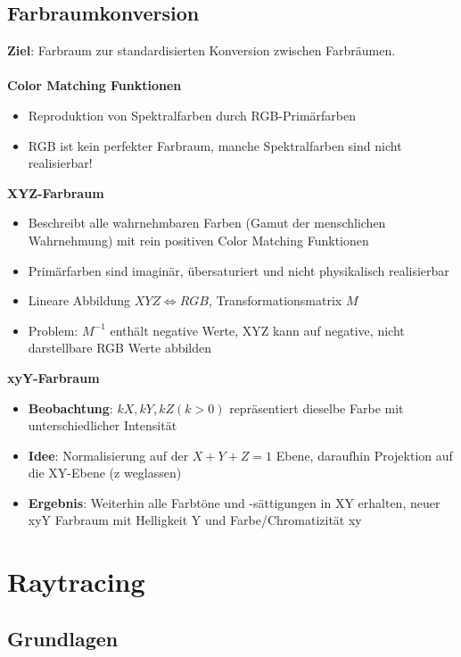 \documentclass[10pt,a4paper]{article}
\begin{document}
	\subsection{Farbraumkonversion}
	\label{bfp:sub:farbraumkonversion}

	\textbf{Ziel}: Farbraum zur standardisierten Konversion zwischen Farbräumen.\\\\
	\textbf{Color Matching Funktionen}
		\begin{itemize}
			\item Reproduktion von Spektralfarben durch RGB-Primärfarben
			\item RGB ist kein perfekter Farbraum, manche Spektralfarben sind nicht realisierbar!
		\end{itemize}		
	\textbf{XYZ-Farbraum}
		\begin{itemize}
			\item Beschreibt alle wahrnehmbaren Farben (\glqq Gamut der menschlichen Wahrnehmung\grqq) mit rein positiven Color Matching Funktionen
			\item Primärfarben sind imaginär, übersaturiert und nicht physikalisch realisierbar
			\item Lineare Abbildung $XYZ \Leftrightarrow RGB$, Transformationsmatrix $M$
			\item Problem: $M^{-1}$ enthält negative Werte, XYZ kann auf negative, nicht darstellbare RGB Werte abbilden
		\end{itemize}
	\textbf{xyY-Farbraum}
		\begin{itemize}
			\item \textbf{Beobachtung}: $kX, kY, kZ (k > 0)$ repräsentiert dieselbe Farbe mit unterschiedlicher Intensität
			\item \textbf{Idee}: Normalisierung auf der $X + Y + Z = 1$ Ebene, daraufhin Projektion auf die XY-Ebene (z weglassen)
			\item \textbf{Ergebnis}: Weiterhin alle Farbtöne und -sättigungen in XY erhalten, neuer xyY Farbraum mit Helligkeit Y und Farbe/Chromatizität xy
		\end{itemize}

	\newpage
	\section{Raytracing}
	\label{rt:sec:raytracing}

	\subsection{Grundlagen}
	\label{rt:sub:grundlagen}
\end{document}
